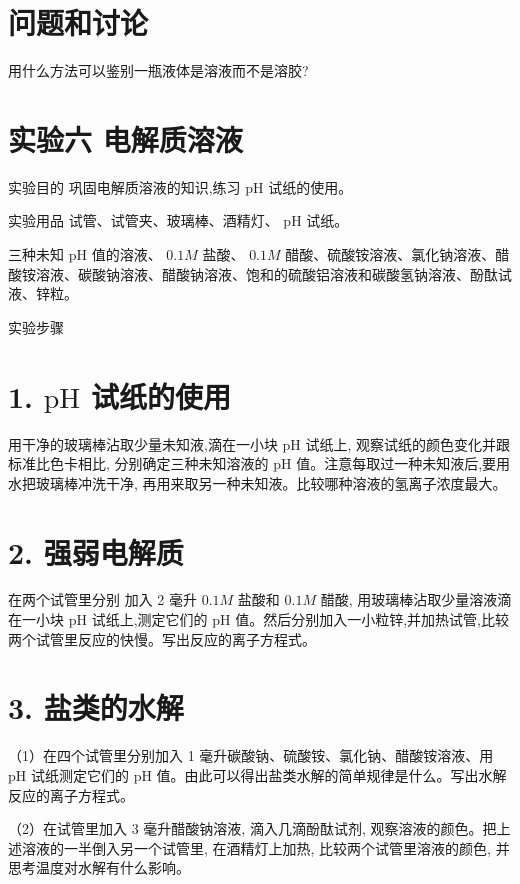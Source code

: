 \documentclass[10pt]{article}
\begin{document}
\section*{问题和讨论}

用什么方法可以鉴别一瓶液体是溶液而不是溶胶?

\section*{实验六 电解质溶液}

实验目的 巩固电解质溶液的知识,练习 \(\mathrm{{pH}}\) 试纸的使用。

实验用品 试管、试管夹、玻璃棒、酒精灯、 \(\mathrm{{pH}}\) 试纸。

三种未知 \(\mathrm{{pH}}\) 值的溶液、 \({0.1M}\) 盐酸、 \({0.1M}\) 醋酸、硫酸铵溶液、氯化钠溶液、醋酸铵溶液、碳酸钠溶液、醋酸钠溶液、饱和的硫酸铝溶液和碳酸氢钠溶液、酚酞试液、锌粒。

实验步骤

\section*{1. \(\mathrm{{pH}}\) 试纸的使用}

用干净的玻璃棒沾取少量未知液,滴在一小块 \(\mathrm{{pH}}\) 试纸上, 观察试纸的颜色变化并跟标准比色卡相比, 分别确定三种未知溶液的 \(\mathrm{{pH}}\) 值。注意每取过一种未知液后,要用水把玻璃棒冲洗干净, 再用来取另一种未知液。比较哪种溶液的氢离子浓度最大。

\section*{2. 强弱电解质}

在两个试管里分别 加入 2 毫升 \({0.1M}\) 盐酸和 \({0.1M}\) 醋酸, 用玻璃棒沾取少量溶液滴在一小块 \(\mathrm{{pH}}\) 试纸上,测定它们的 \(\mathrm{{pH}}\) 值。然后分别加入一小粒锌,并加热试管,比较两个试管里反应的快慢。写出反应的离子方程式。

\section*{3. 盐类的水解}

（1）在四个试管里分别加入 1 毫升碳酸钠、硫酸铵、氯化钠、醋酸铵溶液、用 \(\mathrm{{pH}}\) 试纸测定它们的 \(\mathrm{{pH}}\) 值。由此可以得出盐类水解的简单规律是什么。写出水解反应的离子方程式。

（2）在试管里加入 3 毫升醋酸钠溶液, 滴入几滴酚酞试剂, 观察溶液的颜色。把上述溶液的一半倒入另一个试管里, 在酒精灯上加热, 比较两个试管里溶液的颜色, 并思考温度对水解有什么影响。
\end{document}
